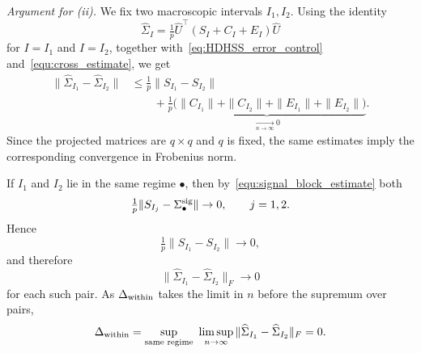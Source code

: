 \documentclass[10pt, letterpaper]{amsart}
\begin{document}
\medskip

\noindent\emph{Argument for (ii).}
We fix two macroscopic intervals $I_1,I_2$. Using the identity
\[
\widehat\Sigma_{I}
=
\tfrac1p\widehat U^{\top}(S_I+C_I+E_I)\widehat U
\]
for $I=I_1$ and $I=I_2$, together with~\eqref{eq:HDHSS_error_control} and~\eqref{equ:cross_estimate}, we get
\begin{align}\label{equ:diff_decomp}
\| \widehat\Sigma_{I_1}-\widehat\Sigma_{I_2} \|
& \le
\tfrac1p \| S_{I_1}-S_{I_2} \| \\
& \qquad
+
\underbrace{
\tfrac1p\bigl(\|C_{I_1}\|+\|C_{I_2}\|+\|E_{I_1}\|+\|E_{I_2}\|\bigr)
}_{\xrightarrow[n\to\infty]{}0}.
\end{align}
Since the projected matrices are $q\times q$ and $q$ is fixed, the same estimates imply the corresponding convergence in Frobenius norm.

If $I_1$ and $I_2$ lie in the same regime $\bullet$, then by~\eqref{equ:signal_block_estimate} both
\[
\tfrac1p\|S_{I_j}-\Sigma_\bullet^{\rm sig}\|\to0,
\qquad j=1,2.
\]
Hence
\[
\tfrac1p\|S_{I_1}-S_{I_2}\|\to0,
\]
and therefore
\[
\|\widehat\Sigma_{I_1}-\widehat\Sigma_{I_2}\|_F\to0
\]
for each such pair. As $\Delta_{\textup{within}}$ takes the limit in $n$ before the supremum over pairs,
\begin{align}
\Delta_{\textup{within}}
=
\sup_{\text{same regime}}\
\limsup_{n\to\infty}
\|\widehat\Sigma_{I_1}-\widehat\Sigma_{I_2}\|_F
=
0 .
\end{align}
\end{document}

